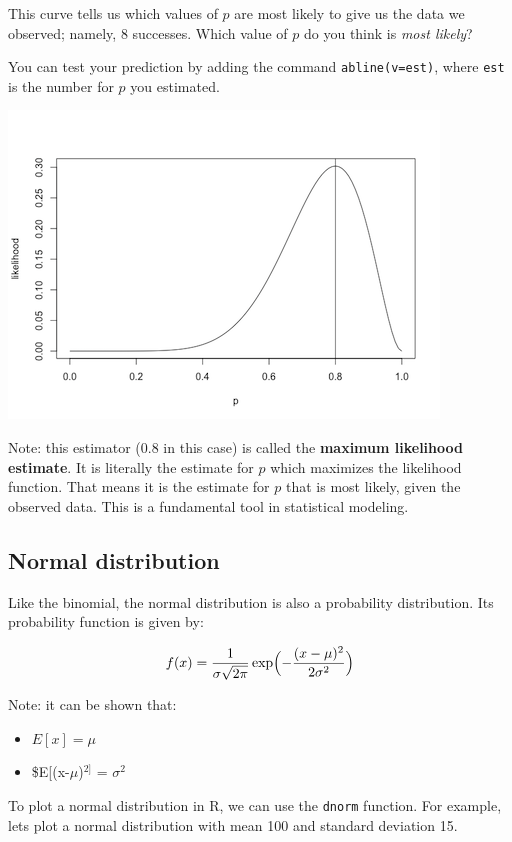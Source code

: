 \documentclass[11pt]{article}
\begin{document}
This curve tells us which values of $p$ are most likely to give us the data we observed; namely, 8 successes.  Which value of $p$ do you think is \emph{most likely}?

You can test your prediction by adding the command \texttt{abline(v=est)}, where \texttt{est} is the number for $p$ you estimated.

\includegraphics[width=.9\linewidth]{figures/week1/mle.png}

Note: this estimator (0.8 in this case) is called the \textbf{maximum likelihood estimate}.  It is literally the estimate for $p$ which maximizes the likelihood function.  That means it is the estimate for $p$ that is most likely, given the observed data.  This is a fundamental tool in statistical modeling.

\subsection*{Normal distribution}
\label{sec-2-2}

Like the binomial, the normal distribution is also a probability distribution.  Its probability function is given by:

\[
f(x)=\frac{1}{\sigma\sqrt{2\pi}}\exp \Bigl( -\frac{(x-\mu)^2}{2\sigma^2}\Bigr)
\]

Note: it can be shown that:
\begin{itemize}
\item $E[x]=\mu$
\item \$E[(x-$\mu$)$^{\text{2]}}$ = $\sigma^2$
\end{itemize}

To plot a normal distribution in R, we can use the \texttt{dnorm} function.  For example, lets plot a normal distribution with mean 100 and standard deviation 15.
\end{document}
